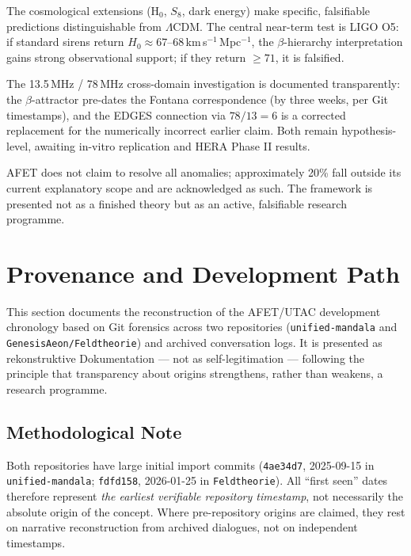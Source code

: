 \documentclass[12pt,a4paper]{article}
\theoremstyle{definition}
\begin{document}
The cosmological extensions (H$_0$, $S_8$, dark energy) make specific, falsifiable
predictions distinguishable from $\Lambda$CDM.
The central near-term test is LIGO O5: if standard sirens return
$H_0 \approx 67$--68\,km\,s$^{-1}$\,Mpc$^{-1}$, the $\beta$-hierarchy interpretation
gains strong observational support; if they return $\geq 71$, it is falsified.

The 13.5\,MHz / 78\,MHz cross-domain investigation is documented transparently:
the $\beta$-attractor pre-dates the Fontana correspondence (by three weeks, per
Git timestamps), and the EDGES connection via $78/13=6$ is a corrected replacement
for the numerically incorrect earlier claim.
Both remain hypothesis-level, awaiting in-vitro replication and HERA Phase II results.

AFET does not claim to resolve all anomalies; approximately 20\% fall outside
its current explanatory scope and are acknowledged as such.
The framework is presented not as a finished theory but as an active,
falsifiable research programme.

\section{Provenance and Development Path}
\label{sec:provenance}

This section documents the reconstruction of the AFET/UTAC development chronology
based on Git forensics across two repositories (\texttt{unified-mandala} and
\texttt{GenesisAeon/Feldtheorie}) and archived conversation logs.
It is presented as rekonstruktive Dokumentation --- not as self-legitimation ---
following the principle that transparency about origins strengthens, rather than
weakens, a research programme.

\subsection*{Methodological Note}

Both repositories have large initial import commits
(\texttt{4ae34d7}, 2025-09-15 in \texttt{unified-mandala};
\texttt{fdfd158}, 2026-01-25 in \texttt{Feldtheorie}).
All ``first seen'' dates therefore represent \emph{the earliest verifiable
repository timestamp}, not necessarily the absolute origin of the concept.
Where pre-repository origins are claimed, they rest on narrative reconstruction
from archived dialogues, not on independent timestamps.
\end{document}
